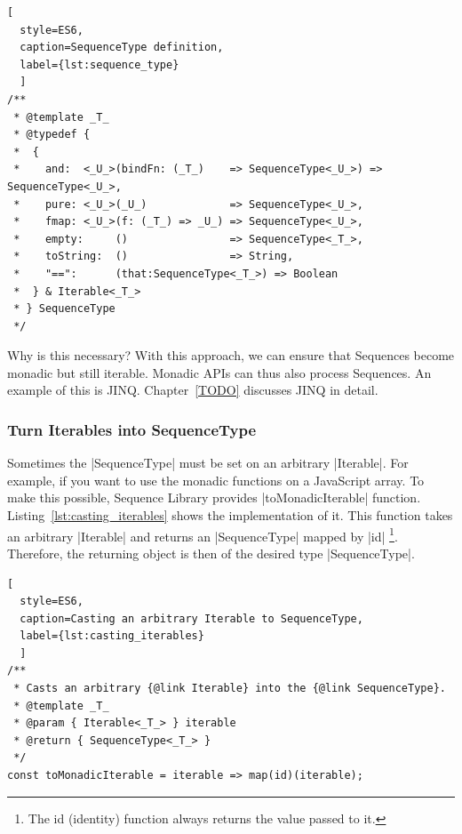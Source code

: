 \begin{lstlisting}[
  style=ES6, 
  caption=SequenceType definition,
  label={lst:sequence_type}
  ]
/**
 * @template _T_
 * @typedef {
 *  {
 *    and:  <_U_>(bindFn: (_T_)    => SequenceType<_U_>) => SequenceType<_U_>,
 *    pure: <_U_>(_U_)             => SequenceType<_U_>,
 *    fmap: <_U_>(f: (_T_) => _U_) => SequenceType<_U_>,
 *    empty:     ()                => SequenceType<_T_>,
 *    toString:  ()                => String,
 *    "==":      (that:SequenceType<_T_>) => Boolean
 *  } & Iterable<_T_>
 * } SequenceType
 */
\end{lstlisting}

Why is this necessary? With this approach, we can ensure that Sequences become
monadic but still iterable. Monadic APIs can thus also process Sequences. An
example of this is JINQ. Chapter~\ref{TODO} discusses JINQ in detail.


\subsubsection{Turn Iterables into SequenceType}
\label{subsub:Turn Iterables into SequenceType}
Sometimes the |SequenceType| must be set on an arbitrary |Iterable|. For example,
if you want to use the monadic functions on a JavaScript array. To make this
possible, Sequence Library provides |toMonadicIterable| function.
Listing~\ref{lst:casting_iterables} shows the
implementation of it. This function takes an arbitrary |Iterable| and returns an
|SequenceType| mapped by |id| \footnote{The id (identity) function always
returns the value passed to it.}. 
Therefore, the returning object is then of the desired type |SequenceType|.

\begin{lstlisting}[
  style=ES6, 
  caption=Casting an arbitrary Iterable to SequenceType,
  label={lst:casting_iterables}
  ]
/**
 * Casts an arbitrary {@link Iterable} into the {@link SequenceType}.
 * @template _T_
 * @param { Iterable<_T_> } iterable
 * @return { SequenceType<_T_> }
 */
const toMonadicIterable = iterable => map(id)(iterable);
\end{lstlisting}
